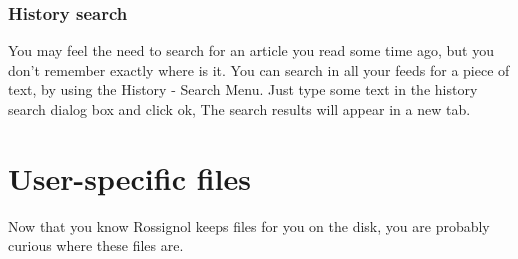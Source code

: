 \documentclass[11pt]{article} %
\begin{document}
\subsubsection{History search}

You may feel the need to search for an article you read some time ago, but you 
don't remember exactly where is it. You can search in all your feeds 
for a piece of text, by using the History - Search Menu. Just type some text in 
the history search dialog box and click ok, The search results will appear in a 
new tab.

\section{User-specific files}

Now that you know Rossignol keeps files for you on the disk, you are probably 
curious where these files are. 
\end{document}
